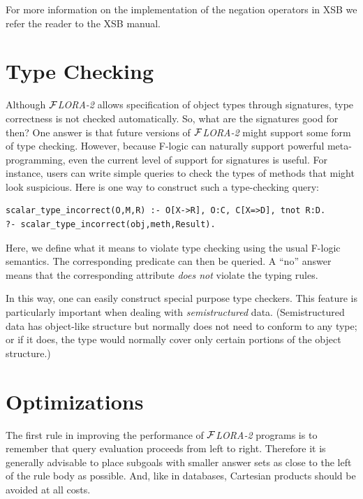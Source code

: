 \documentclass[11pt]{article}
\newcommand{\FLORA}{{\mbox{${\cal F}${\small\it LORA}\rm\emph{-2}}}\xspace}
\newcommand{\fl}{\mbox{F-logic}\xspace}
\begin{document}
For more information on the implementation of the negation operators in XSB
we refer the reader to the XSB manual.




\section{Type Checking}


Although \FLORA allows specification of object types through signatures,
type correctness is not checked automatically. So, what are the
signatures good for then? One answer is that future versions of \FLORA
might support some form of type checking. However, because \fl can
naturally support powerful meta-programming, even the current level
of support for signatures is useful. For instance, users can write
simple queries to check the types of methods that might look suspicious.
Here is one way to construct such a type-checking query:
\begin{verbatim}
scalar_type_incorrect(O,M,R) :- O[X->R], O:C, C[X=>D], tnot R:D.
?- scalar_type_incorrect(obj,meth,Result).
\end{verbatim}
Here, we define what it means to violate type checking using the usual
\fl semantics. The corresponding predicate can then be queried. A
``no'' answer means that the corresponding attribute \emph{does not}
violate the typing rules.

In this way, one can easily construct special purpose type checkers.  This
feature is particularly important when dealing with \emph{semistructured}
data. (Semistructured data has object-like structure but normally does not
need to conform to any type; or if it does, the type would normally cover
only certain portions of the object structure.)


\section{Optimizations}

The first rule in improving the performance of \FLORA programs is to
remember that query evaluation proceeds from left to right. Therefore it is
generally advisable to place subgoals with smaller answer sets as close to
the left of the rule body as possible. And, like in databases, Cartesian
products should be avoided at all costs.
\end{document}
